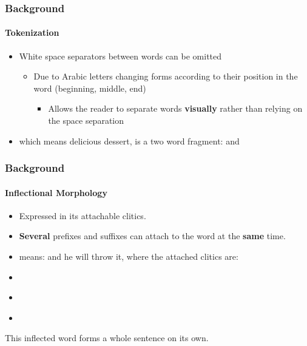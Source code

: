 \documentclass[xcolor=table]{beamer}
\newcommand{\bi}{\begin{itemize}}
\newcommand{\ei}{\end{itemize}}
\newcommand{\I}{\item}
\begin{document}

\begin{frame}
\frametitle{Background}
\framesubtitle{Tokenization}

\begin{itemize}
\item White space separators between words can be omitted
\bi
\I Due to Arabic letters changing forms according to their position in the word (beginning, middle, end)
\bi
\I Allows the reader to separate words \textbf{visually} rather than relying on the space separation
\ei
\ei



\item {} which means delicious dessert, is a two word fragment: 
and 
\end{itemize}
\end{frame}


\begin{frame}
\frametitle{Background}
\framesubtitle{Inflectional Morphology}
\begin{itemize}
\item Expressed in its attachable clitics.
\item \textbf{Several} prefixes and suffixes can attach to the word at the \textbf{same} time.
\item \textbf{}
means: and he will throw it, where the attached clitics are:
\item \textbf{}
\item \textbf{}
\item \textbf{}

\end{itemize}
This inflected word forms a whole sentence on its own.

\end{frame}
\end{document}
